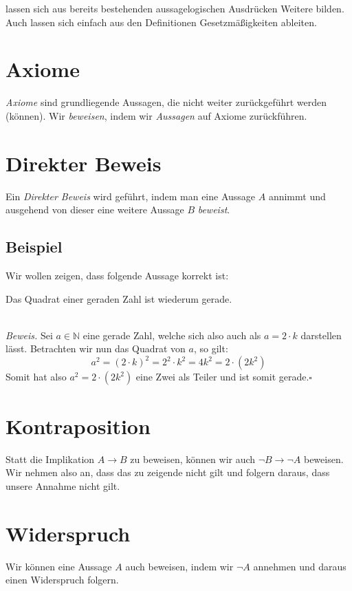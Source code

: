 \documentclass{scrreprt}
\newenvironment{proof}{\emph{\\Beweis.}}{}
\newcommand{\NN}{\mathbb{N}}
\begin{document}
	lassen sich aus bereits bestehenden aussagelogischen Ausdrücken Weitere bilden. Auch lassen sich einfach aus den Definitionen Gesetzmäßigkeiten ableiten.

	\section{Axiome}
	\emph{Axiome} sind grundliegende Aussagen, die nicht weiter zurückgeführt werden (können). Wir \emph{beweisen}, indem wir \emph{Aussagen} auf Axiome zurückführen.

	\section{Direkter Beweis}
	Ein \emph{Direkter Beweis} wird geführt, indem man eine Aussage $A$ annimmt und ausgehend von dieser eine weitere Aussage $B$ \emph{beweist}.

	\subsection{Beispiel}
	Wir wollen zeigen, dass folgende Aussage korrekt ist:
	\begin{center}
		Das Quadrat einer geraden Zahl ist wiederum gerade.
	\end{center}
	\begin{proof}
		Sei $a \in \NN$ eine gerade Zahl, welche sich also auch als $a = 2 \cdot k$ darstellen lässt. Betrachten wir nun das Quadrat von $a$, so gilt:
		\begin{equation*}
			a^2 = (2 \cdot k)^2 = 2^2 \cdot k^2 = 4 k^2 = 2 \cdot (2 k^2)
		\end{equation*}
		Somit hat also $a^2 = 2 \cdot (2 k^2)$ eine Zwei als Teiler und ist somit gerade.$\square$
	\end{proof}

	\section{Kontraposition}
	Statt die Implikation $A \rightarrow B$ zu beweisen, können wir auch $\neg B \rightarrow \neg A$ beweisen. Wir nehmen also an, dass das zu zeigende nicht gilt und folgern daraus, dass unsere Annahme nicht gilt.

	\section{Widerspruch}
	Wir können eine Aussage $A$ auch beweisen, indem wir $\neg A$ annehmen und daraus einen Widerspruch folgern.
\end{document}
